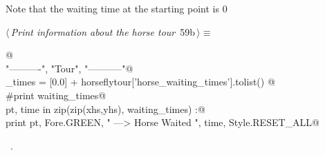 \documentclass[11.5pt]{report}
\begin{document}
\vspace{-0.8cm} \newchunk  Note that the waiting time at the starting point is 0
\begin{flushleft} \small\label{scrap88}\raggedright\small
{} $\langle\,${\itshape Print information about the horse tour}\nobreak\ {\footnotesize {59b}}$\,\rangle\equiv$
\vspace{-1ex}
\begin{list}{}{} \item
\mbox{}\verb@   @\\
\mbox{}\verb@print "\n----------", "\nHorse Tour", "\n-----------"@\\
\mbox{}\verb@waiting_times = [0.0] + horseflytour['horse_waiting_times'].tolist() @\\
\mbox{}\verb@#print waiting_times@\\
\mbox{}\verb@for pt, time in zip(zip(xhs,yhs), waiting_times) :@\\
\mbox{}\verb@   print pt, Fore.GREEN, " ---> Horse Waited ", time, Style.RESET_ALL@\\
\mbox{}\verb@@{\NWsep}
\end{list}
\vspace{-1.5ex}
\footnotesize
\begin{list}{}{\setlength{\itemsep}{-\parsep}\setlength{\itemindent}{-\leftmargin}}
\item \NWtxtMacroRefIn\ .

\item{}
\end{list}
\vspace{4ex}
\end{flushleft}
\end{document}

